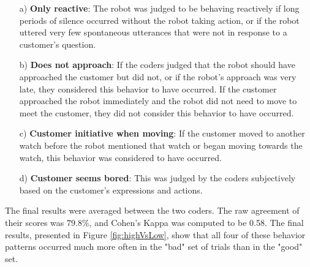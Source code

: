 \documentclass[journal]{IEEEtran}
\begin{document}
\begin{itemize}
  \item [a)] {\bf Only reactive}: The robot was judged to be behaving reactively if long periods of silence occurred without the robot taking action, or if the robot uttered very few spontaneous utterances that were not in response to a customer's question.

  \item [b)] {\bf Does not approach}: If the coders judged that the robot should have approached the customer but did not, or if the robot's approach was very late, they considered this behavior to have occurred.  
  If the customer approached the robot immediately and the robot did not need to move to meet the customer, they did not consider this behavior to have occurred.
  
  \item [c)] {\bf Customer initiative when moving}: If the customer moved to another watch before the robot mentioned that watch or began moving towards the watch, this behavior was considered to have occurred.
  
  \item [d)] {\bf Customer seems bored}: This was judged by the coders subjectively based on the customer's expressions and actions.
\end{itemize}

The final results were averaged between the two coders. The raw agreement of their scores was $79.8\%$, and Cohen's Kappa was computed to be 0.58. The final results, presented in Figure \ref{fig:highVsLow}, show that all four of these behavior patterns occurred much more often in the "bad" set of trials than in the "good" set.
\end{document}
